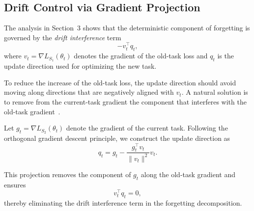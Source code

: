 \documentclass{article}
\begin{document}


\subsection{Drift Control via Gradient Projection}

The analysis in Section~3 shows that the deterministic component of forgetting is governed by the \emph{drift interference} term
\begin{equation}
- v_t^\top q_t ,
\end{equation}
where $v_t=\nabla L_{S_1}(\theta_t)$ denotes the gradient of the old-task loss and $q_t$ is the update direction used for optimizing the new task.

To reduce the increase of the old-task loss, the update direction should avoid moving along directions that are negatively aligned with $v_t$. A natural solution is to remove from the current-task gradient the component that interferes with the old-task gradient~\cite{lopez-pazGradientEpisodicMemory2017,farajtabarOrthogonalGradientDescent2020}.

Let $g_t=\nabla L_{S_2}(\theta_t)$
denote the gradient of the current task.
Following the orthogonal gradient descent principle, we construct the update direction as
\begin{equation}
q_t
=
g_t
-
\frac{g_t^\top v_t}{\|v_t\|^2} v_t .
\end{equation}

This projection removes the component of $g_t$ along the old-task gradient and ensures
\begin{equation}
v_t^\top q_t = 0 ,
\end{equation}
thereby eliminating the drift interference term in the forgetting decomposition.
\end{document}
